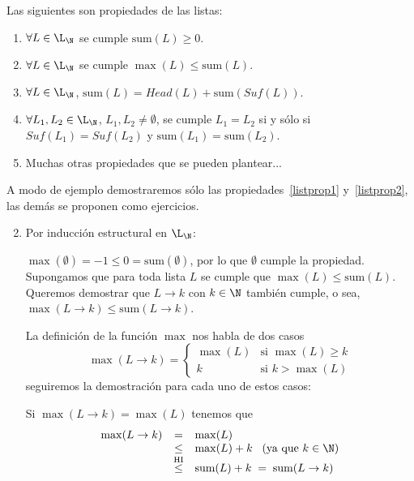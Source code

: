 \begin{teorema}
Las siguientes son propiedades de las listas:
\begin{enumerate}
\itemsep 0pt
\item $\forall L\in\L_\N$ se cumple $\text{sum}(L)\geq 0$.
\item $\forall L\in\L_\N$ se cumple $\max(L)\leq\text{sum}(L)$. \label{listprop1}
\item $\forall L\in\L_\N$, $\text{sum}(L)=Head(L)+\text{sum}(Suf(L))$.
\item $\forall L_1,L_2\in\L_\N$, $L_1,L_2\not=\emptyset$, se cumple $L_1=L_2$ si y sólo si $Suf(L_1)=Suf(L_2)$ y $\text{sum}(L_1)=\text{sum}(L_2)$. \label{listprop2}
\item Muchas otras propiedades que se pueden plantear...
\end{enumerate}
\begin{demostracion}
A modo de ejemplo demostraremos sólo las propiedades~\ref{listprop1} y~\ref{listprop2}, las demás se proponen como ejercicios.
\begin{enumerate}
	\setcounter{enumi}{1}
	\item Por inducción estructural en $\L_\N$:
	\begin{inducciondemo}
		\BI $\max(\emptyset)=-1\leq 0=\text{sum}(\emptyset)$, por lo que $\emptyset$ cumple la propiedad.
		\HI Supongamos que para toda lista $L$ se cumple que $\max(L)\leq\text{sum}(L)$.
		\TI Queremos demostrar que $L\rightarrow k$ con $k\in \N$ también cumple, o sea, $\max(L\rightarrow k)\leq\text{sum}(L\rightarrow k)$.
		
		La definición de la función $\max$ nos habla de dos casos
		\[
		\max(L\rightarrow k)=\left\{
		\begin{array}{cl}
		\max(L) & \text{si }\max(L)\geq k \\
		k & \text{si }k>\max(L)
		\end{array}\right.
		\]
		seguiremos la demostración para cada uno de estos casos:
		
		Si $\max(L\rightarrow k)=\max(L)$ tenemos que
		  \[
		  \begin{array}{rcl}
		  \max(L\rightarrow k) & = & \max(L) \\
		  & \leq & \max(L) + k \;\;\; \text{(ya que }k\in\N\text{)}\\
		  & \stackrel{\text{HI}}{\leq}& \text{sum}(L) + k \; =\; \text{sum}(L\rightarrow k)
		  \end{array}
		  \]
		

\end{inducciondemo}
\end{enumerate}
\end{demostracion}
\end{teorema}
